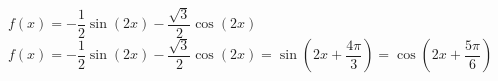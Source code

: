 {$f(x) = -\dfrac{1}{2}\sin(2x) - \dfrac{\sqrt{3}}{2}\cos(2x)$}
{$f(x) = -\dfrac{1}{2}\sin(2x) - \dfrac{\sqrt{3}}{2}\cos(2x) = \sin\left(2x + \dfrac{4\pi}{3}\right) = \cos\left(2x + \dfrac{5\pi}{6}\right)$}
